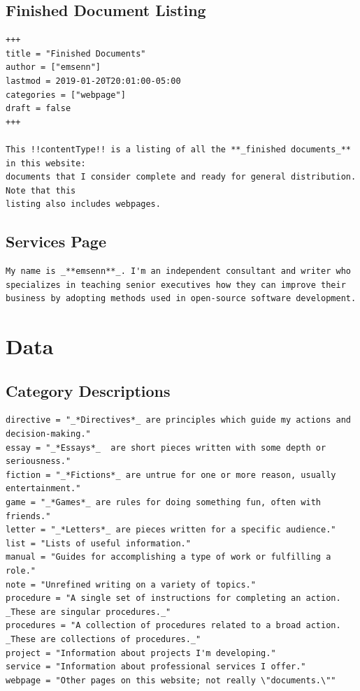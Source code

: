 \documentclass[11pt]{article}
\begin{document}
\subsection{Finished Document Listing}
\label{sec:org57bfb89}
\begin{verbatim}
+++
title = "Finished Documents"
author = ["emsenn"]
lastmod = 2019-01-20T20:01:00-05:00
categories = ["webpage"]
draft = false
+++

This !!contentType!! is a listing of all the **_finished documents_** in this website:
documents that I consider complete and ready for general distribution.  Note that this
listing also includes webpages.
\end{verbatim}
\subsection{Services Page}
\label{sec:orgf77f7a3}
\begin{verbatim}
My name is _**emsenn**_. I'm an independent consultant and writer who
specializes in teaching senior executives how they can improve their
business by adopting methods used in open-source software development.
\end{verbatim}
\section{Data}
\label{sec:orgd4d0ee4}
\subsection{Category Descriptions}
\label{sec:org709d673}
\begin{verbatim}
directive = "_*Directives*_ are principles which guide my actions and decision-making."
essay = "_*Essays*_  are short pieces written with some depth or seriousness."
fiction = "_*Fictions*_ are untrue for one or more reason, usually entertainment."
game = "_*Games*_ are rules for doing something fun, often with friends."
letter = "_*Letters*_ are pieces written for a specific audience."
list = "Lists of useful information."
manual = "Guides for accomplishing a type of work or fulfilling a role."
note = "Unrefined writing on a variety of topics."
procedure = "A single set of instructions for completing an action.  _These are singular procedures._"
procedures = "A collection of procedures related to a broad action.  _These are collections of procedures._"
project = "Information about projects I'm developing."
service = "Information about professional services I offer."
webpage = "Other pages on this website; not really \"documents.\""
\end{verbatim}
\end{document}
